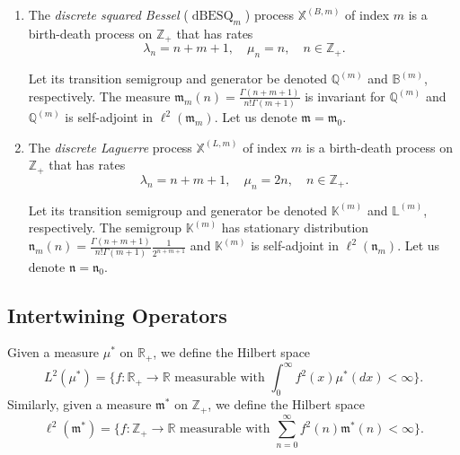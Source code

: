 \documentclass[11pt,a4,reqno]{amsart}
\numberwithin{equation}{section}
\theoremstyle{definition}
\theoremstyle{remark}
\newcommand{\bb}[1]{\mathbb{#1}}
\newcommand{\frk}[1]{\mathfrak{#1}}
\newcommand{\R}{\bb{R}}
\newcommand{\Z}{\bb{Z}}
\DeclareMathOperator{\dbesq}{dBESQ}
\newcommand{\beq}{\begin{equation}}
\newcommand{\eeq}{\end{equation}}
\begin{document}
	\begin{enumerate}
	
		\item The \textit{discrete squared Bessel} ($\dbesq_m$) process $\bb{X}^{(B, m)}$ of index $m$ is a birth-death process on $\Z_+$ that has rates
		\beq \lambda_n = n + m + 1, \quad \mu_n = n , \quad n \in \Z_+. \eeq
		
		Let its transition semigroup and generator be denoted $\bb{Q}^{(m)}$ and $\bb{B}^{(m)}$, respectively. The measure $\frk{m}_m(n) = \frac{\Gamma(n + m + 1)}{n! \Gamma(m + 1)}$ is invariant for $\bb{Q}^{(m)}$ and $\bb{Q}^{(m)}$ is self-adjoint in $\ell^2(\frk{m}_m)$. Let us denote $\frk{m} = \frk{m}_0$. 
		
		\item The \textit{discrete Laguerre} process $\bb{X}^{(L, m)}$ of index $m$ is a birth-death process on $\Z_+$ that has rates
		\beq \lambda_n = n + m + 1, \quad \mu_n = 2 n , \quad n \in \Z_+. \eeq
		
		Let its transition semigroup and generator be denoted $\bb{K}^{(m)}$ and $\bb{L}^{(m)}$, respectively. The semigroup $\bb{K}^{(m)}$ has stationary distribution $\frk{n}_m(n) = \frac{\Gamma(n + m + 1)}{n! \Gamma(m + 1)} \frac{1}{2^{n+m+1}}$ and $\bb{K}^{(m)}$ is self-adjoint in $\ell^2(\frk{n}_m)$. Let us denote $\frk{n} = \frk{n}_0$. 

	
	
	\end{enumerate}

\subsection{Intertwining Operators}
	Given a measure $\mu^*$ on $\R_+$, we define the Hilbert space
	\beq L^2 (\mu^*) = \{f: \R_+ \to \R \text{ measurable with } \int_0^{\infty} f^2 (x) \mu^* (dx) < \infty \}. \eeq
	Similarly, given a measure $\frk{m}^*$ on $\Z_+$, we define the Hilbert space
	\beq \ell^2 (\frk{m}^*) = \{f: \Z_+ \to \R \text{ measurable with } \sum_{n=0}^{\infty} f^2 (n) \frk{m}^* (n) < \infty \}. \eeq
	
\end{document}
